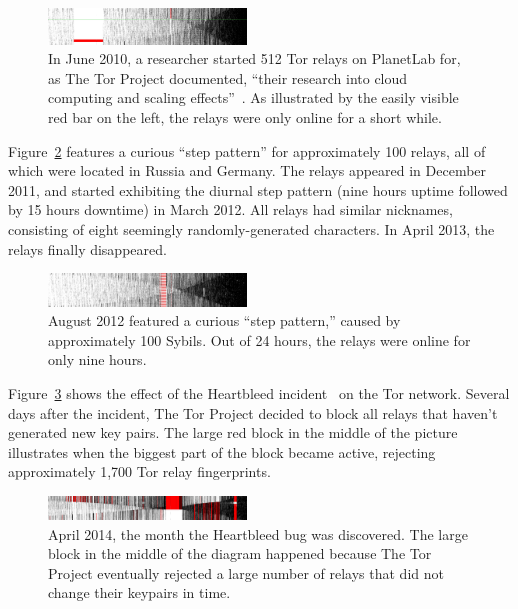 \begin{figure}[t]
	\centering
	\includegraphics[width=0.47\textwidth]{diagrams/planetlab-uptimes.jpg}
	\caption{In June 2010, a researcher started 512 Tor relays on PlanetLab for,
		as The Tor Project documented, ``their research into cloud computing and
		scaling effects''~\cite{progressreport}.  As illustrated by the easily
		visible red bar on the left, the relays were only online for a short
		while.}
	\label{fig:2010-06-planetlab}
\end{figure}

Figure~\ref{fig:2012-08-steppattern} features a curious ``step pattern'' for
approximately 100 relays, all of which were located in Russia and Germany.  The
relays appeared in December 2011, and started exhibiting the diurnal step
pattern (nine hours uptime followed by 15 hours downtime) in March 2012.  All
relays had similar nicknames, consisting of eight seemingly randomly-generated
characters.  In April 2013, the relays finally disappeared.

\begin{figure}[t]
	\centering
	\includegraphics[width=0.47\textwidth]{diagrams/2012-08.jpg}
	\caption{August 2012 featured a curious ``step pattern,'' caused by
	approximately 100 Sybils.  Out of 24 hours, the relays were online for only
	nine hours.}
	\label{fig:2012-08-steppattern}
\end{figure}

Figure~\ref{fig:2014-04-heartbleed} shows the effect of the Heartbleed
incident~\cite{Durumeric2014a} on the Tor network.  Several days after the
incident, The Tor Project decided to block all relays that haven't generated new
key pairs.  The large red block in the middle of the picture illustrates when
the biggest part of the block became active, rejecting approximately 1,700 Tor
relay fingerprints.

\begin{figure}[t]
	\centering
	\includegraphics[width=0.47\textwidth]{diagrams/heartbleed-uptimes.jpg}
	\caption{April 2014, the month the Heartbleed bug was discovered.
		The large block in the middle of the diagram happened because The
		Tor Project eventually rejected a large number of relays that did not
		change their keypairs in time.}
		\label{fig:2014-04-heartbleed}
\end{figure}

